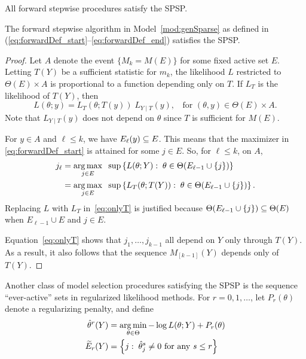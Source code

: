 \documentclass{article}
\begin{document}
\begin{example}
\end{example}

All forward stepwise procedures satisfy the SPSP.

\begin{proposition}\label{prop:forwardSPSP}
  The forward stepwise algorithm in Model~\ref{mod:genSparse} as defined in (\ref{eq:forwardDef_start}--\ref{eq:forwardDef_end}) satisfies the SPSP.
\end{proposition}
\begin{proof}
  Let $A$ denote the event $\{M_k = M(E)\}$ for some fixed active set $E$. Letting $T(Y)$ be a sufficient statistic for $m_k$, the likelihood $L$ restricted to $\Theta(E) \times A$ is proportional to a function depending only on $T$. If $L_T$ is the likelihood of $T(Y)$, then
\[
L(\theta; y) = L_T(\theta; T(y)) \;L_{Y\mid T}(y), \;\; \text{ for } (\theta, y) \in  \Theta(E) \times A.
\]
Note that $L_{Y \mid T}(y)$ does not depend on $\theta$ since $T$ is sufficient for $M(E)$.

For $y\in A$ and $\ell \leq k$, we have $E_\ell(y) \subseteq E$. This means that the maximizer in \eqref{eq:forwardDef_start} is attained for some $j\in E$. So, for $\ell \leq k$, on $A$,
\begin{align}
  j_\ell &= \operatorname*{arg\,max}_{j\in E} \;\;\sup \left\{L(\theta; Y):\;
    \theta\in\Theta(E_{\ell-1} \cup \{j\})\right\} \\
  &= \operatorname*{arg\,max}_{j\in E} \;\;\sup \left\{L_T(\theta; T(Y)):\;
    \theta\in\Theta(E_{\ell-1} \cup \{j\})\right\}. \label{eq:onlyT}
\end{align}
Replacing $L$ with $L_T$ in~\eqref{eq:onlyT} is justified because $\Theta(E_{\ell - 1} \cup \{j\}) \subseteq \Theta(E)$ when $E_{\ell-1}\cup E$ and $j\in E$.

Equation~\eqref{eq:onlyT} shows that $j_1,\ldots, j_{k-1}$ all depend on $Y$ only through $T(Y)$. As a result, it also follows that the sequence $M_{[k-1]}(Y)$ depends only of $T(Y)$.
\end{proof}

Another class of model selection procedures satisfying the SPSP is the sequence ``ever-active'' sets in regularized likelihood methods. For $r=0,1,\ldots$, let $P_r(\theta)$ denote a regularizing penalty, and define
\begin{align}\label{eq:regPathDef_start}
  \hat\theta^{r}(Y) &= 
  \operatorname*{arg\,min}_{\theta\in\Theta} -\log L(\theta; Y) + P_r(\theta) \\
  \widetilde{E}_r(Y) &= \left\{j:\; \hat\theta_j^s \neq 0 
    \text{ for any } s \leq r \right\}
\end{align}
\end{document}

